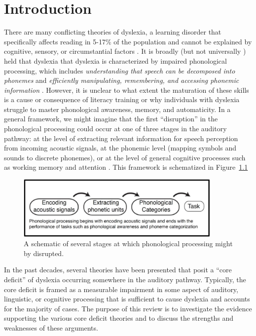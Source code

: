 \documentclass[../uwthesis.tex]{subfiles}
\begin{document}
\chapter {Introduction}
 
There are many conflicting theories of dyslexia, a learning disorder that specifically affects reading in 5-17\% of the population and cannot be explained by cognitive, sensory, or circumstantial factors \citep{Shaywitz1998,Snowling2000}. It is broadly (but not universally \citep{Ramus2008,Pennington2012IndividualModels.}) held that dyslexia that dyslexia is characterized by impaired phonological processing, which includes \textit{understanding that speech can be decomposed into phonemes} and \textit{efficiently manipulating, remembering, and accessing phonemic information} \citep{Wagner1987,Snowling1998}. However, it is unclear to what extent the maturation of these skills is a cause or consequence of literacy training or why individuals with dyslexia struggle to master phonological awareness, memory, and automaticity. In a general framework, we might imagine that the first
“disruption” in the phonological processing could occur at one of three stages in the auditory pathway: at the level of extracting relevant information for speech perception from incoming acoustic signals, at the phonemic level (mapping symbols and sounds to discrete phonemes), or at the level of general cognitive processes such as working memory and attention \citep{Serniclaes2004}. This framework is schematized in Figure~\ref{fig:intro_1}

\begin{figure}
    \centering
    \caption{A schematic of several stages at which phonological processing might by disrupted.}
    \label{fig:intro_1}
    \includegraphics[width=10cm]{images/intro/intro_fig1.png}
\end{figure}
 
In the past decades, several theories have been presented that posit a “core deficit” of dyslexia occurring somewhere in the auditory pathway. Typically, the core deficit is framed as a measurable impairment in some aspect of auditory, linguistic, or cognitive processing that is sufficient to cause dyslexia and accounts for the majority of cases. The purpose of this review is to investigate the evidence supporting the various core deficit theories and to discuss the strengths and weaknesses of these arguments.
\end{document}
